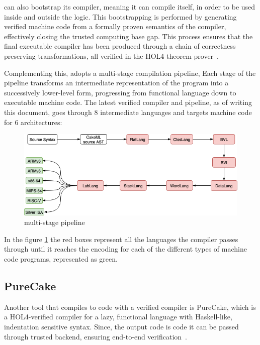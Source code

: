 \cml can also bootstrap its compiler, meaning it can compile itself, in order to be used inside and outside the logic. This 
bootstrapping is performed by generating verified machine code from a formally proven semantics of the compiler, effectively 
closing the trusted computing base gap. This process ensures that the final executable compiler has been produced through a 
chain of correctness preserving transformations, all verified in the HOL4 theorem prover~\cite{TanMKFON19, POPL14}.

Complementing this, \cml adopts a multi-stage compilation pipeline, Each stage of the pipeline transforms an intermediate representation
of the program into a successively lower-level form, progressing from functional language down to executable machine code. The latest 
verified \cml compiler and pipeline, as of writing this document, goes through 8 intermediate languages and targets machine code 
for 6 architectures:

\begin{figure}[H]
    \centering
    \includegraphics[width=\linewidth]{images/CakeMLPipeline.png}
    \caption{\cml multi-stage pipeline}
    \label{fig:CakeMLPipeline}
\end{figure}

In the figure \ref{fig:CakeMLPipeline} the red boxes represent all the languages the compiler passes through until it reaches the
encoding for each of the different types of machine code programs, represented as green.

\subsection{PureCake}

Another tool that compiles to \cml code with a verified compiler is PureCake, which is a HOL4-verified compiler for a lazy, 
functional language with Haskell-like, indentation sensitive syntax. Since, the output code is \cml code it can be passed 
through \cml trusted backend, ensuring end-to-end verification~\cite{KanabarVAMNPZ23}.

